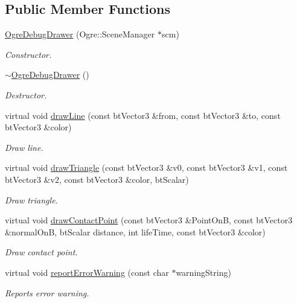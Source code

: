 \subsection*{Public Member Functions}
\begin{DoxyCompactItemize}
\item 
\hyperlink{class_ogre_debug_drawer_affa9afb5fe47e691f51f9e3f8b6bfc06}{Ogre\-Debug\-Drawer} (Ogre\-::\-Scene\-Manager $\ast$scm)
\begin{DoxyCompactList}\small\item\em Constructor. \end{DoxyCompactList}\item 
\hyperlink{class_ogre_debug_drawer_a7fb8d446130457b47e47c5f5ee6a7a43}{$\sim$\-Ogre\-Debug\-Drawer} ()
\begin{DoxyCompactList}\small\item\em Destructor. \end{DoxyCompactList}\item 
virtual void \hyperlink{class_ogre_debug_drawer_a8086cc1f589d77cb7c8ca40d0238e91d}{draw\-Line} (const bt\-Vector3 \&from, const bt\-Vector3 \&to, const bt\-Vector3 \&color)
\begin{DoxyCompactList}\small\item\em Draw line. \end{DoxyCompactList}\item 
virtual void \hyperlink{class_ogre_debug_drawer_aec9e358cee25c958f012d44c224af1dc}{draw\-Triangle} (const bt\-Vector3 \&v0, const bt\-Vector3 \&v1, const bt\-Vector3 \&v2, const bt\-Vector3 \&color, bt\-Scalar)
\begin{DoxyCompactList}\small\item\em Draw triangle. \end{DoxyCompactList}\item 
virtual void \hyperlink{class_ogre_debug_drawer_ad7c599acc8ccd6bef42d4178775ed56b}{draw\-Contact\-Point} (const bt\-Vector3 \&Point\-On\-B, const bt\-Vector3 \&normal\-On\-B, bt\-Scalar distance, int life\-Time, const bt\-Vector3 \&color)
\begin{DoxyCompactList}\small\item\em Draw contact point. \end{DoxyCompactList}\item 
virtual void \hyperlink{class_ogre_debug_drawer_a8ae828583fcb82103c3ba8525448abff}{report\-Error\-Warning} (const char $\ast$warning\-String)
\begin{DoxyCompactList}\small\item\em Reports error warning. \end{DoxyCompactList}\item 

\end{DoxyCompactItemize}
